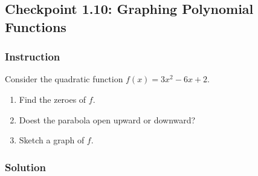 \subsection*{Checkpoint 1.10: Graphing Polynomial Functions}

\subsubsection*{Instruction}

Consider the quadratic function $ f(x) = 3x^2 -6x + 2 $.

\begin{enumerate}[label = (\alph*)]
  \item
    Find the zeroes of $ f $.
  \item
    Doest the parabola open upward or downward?
  \item
    Sketch a graph of $ f $.
\end{enumerate}

\subsubsection*{Solution}

